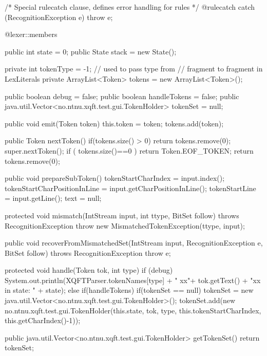 /* Special rulecatch clause, defines error handling for rules */
@rulecatch {
  catch (RecognitionException e) {
    throw e;
  }
}

@lexer::members {

  public int state = 0;
  public State stack = new State();

  private int tokenType = -1; // used to pass type from 
                              // fragment to fragment in LexLiterals
  private ArrayList<Token> tokens = new ArrayList<Token>();

  public boolean debug = false;
  public boolean handleTokens = false;
  public java.util.Vector<no.ntnu.xqft.test.gui.TokenHolder> tokenSet = null;

  public void emit(Token token) {
    this.token = token;
    tokens.add(token);
  }

  public Token nextToken() {
    if(tokens.size() > 0)
        return tokens.remove(0);
    super.nextToken();
    if ( tokens.size()==0 ) {
        return Token.EOF_TOKEN;
    }
    return tokens.remove(0);
  }

  public void prepareSubToken(){
    tokenStartCharIndex = input.index();
    tokenStartCharPositionInLine = input.getCharPositionInLine();
    tokenStartLine = input.getLine();
    text = null;
  }

  protected void mismatch(IntStream input, int ttype, BitSet follow)
      throws RecognitionException
  {
    throw new MismatchedTokenException(ttype, input);
  }

  public void recoverFromMismatchedSet(IntStream input, 
                                       RecognitionException e,
                                       BitSet follow)
      throws RecognitionException
  {
    throw e;
  }


  protected void handle(Token tok, int type) {
    if (debug) 
    System.out.println(XQFTParser.tokenNames[type] + 
                        " xx"+ tok.getText() +
                        "xx in state: " + state);
    else if(handleTokens)
    {
      if(tokenSet == null)
          tokenSet = new java.util.Vector<no.ntnu.xqft.test.gui.TokenHolder>();
      tokenSet.add(new no.ntnu.xqft.test.gui.TokenHolder(this.state,
                                    tok,
                                    type,
                                    this.tokenStartCharIndex,
                                    this.getCharIndex()-1));
    }
  }

  public java.util.Vector<no.ntnu.xqft.test.gui.TokenHolder> getTokenSet()
  {
    return tokenSet;
  }
}


